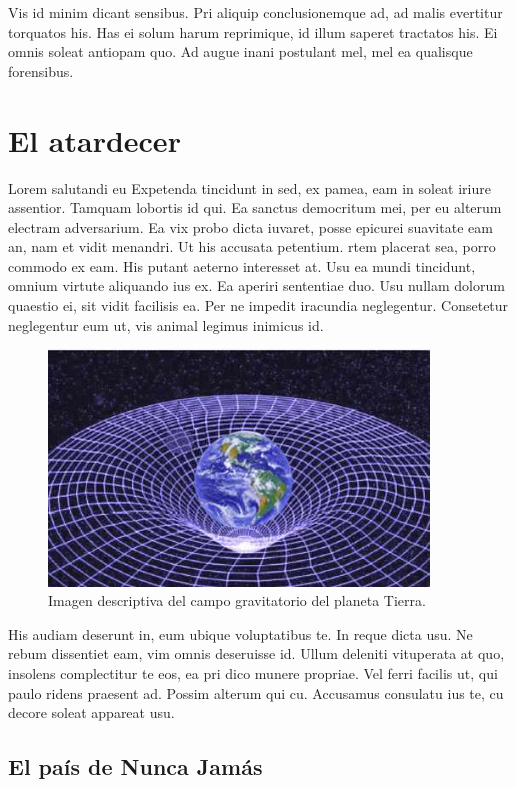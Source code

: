 \documentclass[a4paper, 11pt, titlepage, twocolumn]{book}
\begin{document}
Vis id minim dicant sensibus. Pri aliquip conclusionemque ad, ad malis evertitur torquatos his. Has ei solum harum reprimique, id illum saperet tractatos his. Ei omnis soleat antiopam quo. Ad augue inani postulant mel, mel ea qualisque forensibus.

\chapter{El atardecer}

Lorem salutandi eu 
Expetenda tincidunt in sed, ex pamea, eam in soleat iriure assentior. Tamquam lobortis id qui. Ea sanctus democritum mei, per eu alterum electram adversarium. Ea vix probo dicta iuvaret, posse epicurei suavitate eam an, nam et vidit menandri. Ut his accusata petentium.
rtem placerat sea, porro commodo ex eam. His putant aeterno interesset at. Usu ea mundi tincidunt, omnium virtute aliquando ius ex. Ea aperiri sententiae duo. Usu nullam dolorum quaestio ei, sit vidit facilisis ea. Per ne impedit iracundia neglegentur. Consetetur neglegentur eum ut, vis animal legimus inimicus id.

\begin{figure}[htp]
    \centering
    \includegraphics[width=0.9\textwidth]{imagen.jpeg}
    \caption{Imagen descriptiva del campo gravitatorio del planeta Tierra.}
    \label{}
\end{figure}

His audiam deserunt in, eum ubique voluptatibus te. In reque dicta usu. Ne rebum dissentiet eam, vim omnis deseruisse id. Ullum deleniti vituperata at quo, insolens complectitur te eos, ea pri dico munere propriae. Vel ferri facilis ut, qui paulo ridens praesent ad. Possim alterum qui cu. Accusamus consulatu ius te, cu decore soleat appareat usu.

\section{El país de Nunca Jamás}
\end{document}
